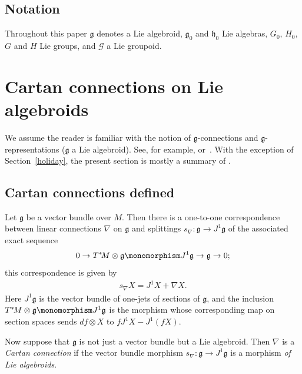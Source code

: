\subsection{Notation}

Throughout this paper ${\mathfrak g} $ denotes a
Lie algebroid, ${\mathfrak g}_0 $ and ${\mathfrak h}_0$ Lie algebras,
$G_0$, $H_0$, $G$ and $H$ Lie groups, and ${\mathcal G}$ a Lie
groupoid.


\section{Cartan connections on Lie algebroids}\label{section1}

We assume the reader is familiar with the notion of $\mathfrak
g$-connections and $\mathfrak g$-representations ($\mathfrak g$ a Lie
algebroid).
See, for example, \cite{Blaom_05} or~\cite{Blaom_12}.  With the
exception of Section~\ref{holiday}, the present section is mostly a summary
of \cite{Blaom_05}.

\subsection{Cartan connections def\/ined}\label{skoj}

Let ${\mathfrak g} $ be a vector bundle over $M$. Then there is a
one-to-one correspondence between linear connections $\nabla$ on
${\mathfrak g}$ and splittings $s_\nabla \colon {\mathfrak g}
\rightarrow J^1{\mathfrak g} $ of the associated exact sequence
\begin{gather*}
                 0\rightarrow T^*\!M\otimes{\mathfrak g}\monomorphism J^1{\mathfrak
                 g}\rightarrow{\mathfrak g}\rightarrow 0;
\end{gather*}
this correspondence is given by
\begin{gather*}
  s_\nabla X=J^1X + \nabla X.%
\end{gather*}
Here $J^1 {\mathfrak g} $ is the vector bundle of one-jets of sections
of $\mathfrak g$, and the inclusion $T^*\!M\otimes{\mathfrak
  g}\monomorphism J^1{\mathfrak g}$ is the morphism whose
corresponding map on section spaces sends $df \otimes X$ to $ f J^1 X
- J^1 (fX)$.

Now suppose that $\mathfrak g$ is not just a vector bundle but a Lie
algebroid. Then $\nabla$ is a {\it Cartan connection} if the vector
bundle morphism $s_\nabla \colon {\mathfrak g} \rightarrow
J^1{\mathfrak g}$ is a morphism {\em of Lie algebroids}.

